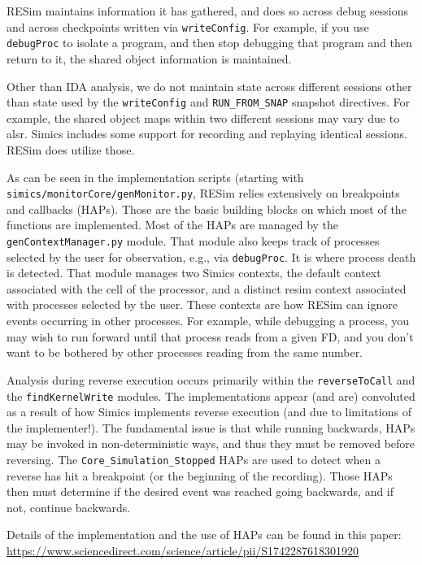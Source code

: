 \documentclass[titlepage]{article}
\begin{document}
RESim maintains information it has gathered, and does so across debug sessions and across checkpoints written via {\tt writeConfig}.  For example, if you
use {\tt debugProc} to isolate a program, and then stop debugging that program and then return to it, the shared object information is maintained.

Other than IDA analysis, we do not maintain state across different sessions other than state used by the {\tt writeConfig} and {\tt RUN\_FROM\_SNAP} snapshot directives.
For example, the shared object maps within two different sessions may vary due to alsr.  Simics includes some support for recording and replaying identical sessions.  
RESim does utilize those.

As can be seen in the implementation scripts (starting with {\tt simics/monitorCore/genMonitor.py}, RESim relies extensively on breakpoints and callbacks (HAPs).  
Those are the basic building blocks on which most of the functions are implemented.  Most of the HAPs are managed by the {\tt genContextManager.py} module.  That module also
keeps track of processes selected by the user for observation, e.g., via {\tt debugProc}.  It is where process death is detected.  That module manages two Simics contexts,
the default context associated with the cell of the processor, and a distinct resim context associated with processes selected by the user.  These contexts are how RESim can 
ignore events occurring in other processes.  For example, while debugging a process, you may wish to run forward until that process reads from a given FD, and you don't want
to be bothered by other processes reading from the same number.

Analysis during reverse execution occurs primarily within the {\tt reverseToCall} and the {\tt findKernelWrite} modules.  The implementations appear (and are) convoluted as
a result of how Simics implements reverse execution (and due to limitations of the implementer!).  The fundamental issue is that while running backwards, HAPs may be
invoked in non-deterministic ways, and thus they must be removed before reversing.  The {\tt Core\_Simulation\_Stopped} HAPs are used to detect when a reverse has
hit a breakpoint (or the beginning of the recording).  Those HAPs then must determine if the desired event was reached going backwards, and if not, continue backwards. 

Details of the implementation and the use of HAPs can be found in this paper: \url{https://www.sciencedirect.com/science/article/pii/S1742287618301920}
\end{document}
